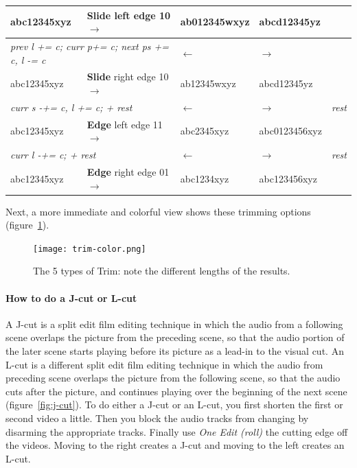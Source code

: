 \begin{table}[ht]
{\begin{tabular}{lllll}
      abc12345xyz & \textbf{Slide} left edge 10 $\rightarrow$ & ab012345wxyz & abcd12345yz &\\
      \midrule
      \multicolumn{2}{l}{\textit{prev l += c; curr p+= c; next ps += c, l -= c}} & $\leftarrow$ & $\rightarrow$ &\\
      abc12345xyz & \textbf{Slide} right edge 10 $\rightarrow$ & ab12345wxyz & abcd12345yz &\\
      \midrule
      \multicolumn{2}{l}{\textit{curr s -+= c, l += c; + rest}} & $\leftarrow$ & $\rightarrow$ & \textit{rest}\\
      abc12345xyz & \textbf{Edge} left edge 11 $\rightarrow$ & abc2345xyz & abc0123456xyz &\\
      \midrule
      \multicolumn{2}{l}{\textit{curr l -+= c; + rest}} & $\leftarrow$ & $\rightarrow$ & \textit{rest}\\
      abc12345xyz & \textbf{Edge} right edge 01 $\rightarrow$ & abc1234xyz & abc123456xyz &\\
      \bottomrule
    \end{tabular}
  }
\end{table}
\renewcommand{\arraystretch}{1}

Next, a more immediate and colorful view shows these trimming
options (figure~\ref{fig:trim-color}).

\begin{figure}[htpb]
    \centering
    \texttt{[image: trim-color.png]}
    \caption{The 5 types of Trim: note the different lengths of the results.}
    \label{fig:trim-color}
\end{figure}

\paragraph{How to do a J-cut or L-cut} A J-cut is a split edit film
editing technique in which the audio from a following scene overlaps
the picture from the preceding scene, so that the audio portion of
the later scene starts playing before its picture as a lead-in to
the visual cut.  An L-cut is a different split edit film editing
technique in which the audio from preceding scene overlaps the
picture from the following scene, so that the audio cuts after the
picture, and continues playing over the beginning of the next scene
(figure~\ref{fig:j-cut}). To do either a J-cut or an L-cut, you
first shorten the first or second video a little.  Then you block
the audio tracks from changing by disarming the appropriate tracks.
Finally use \textit{One Edit (roll)} the cutting edge off the
videos.  Moving to the right creates a J-cut and moving to the left
creates an L-cut.

